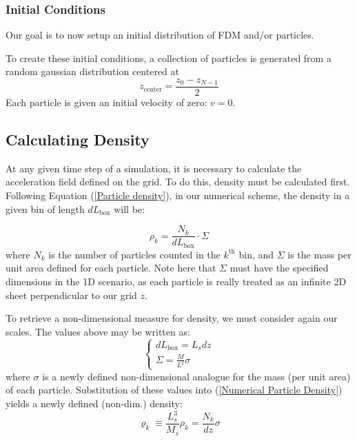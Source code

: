 \documentclass{article}
\begin{document}


\subsubsection{Initial Conditions}
Our goal is to now setup an initial distribution of FDM and/or particles.

To create these initial conditions, a collection of particles is generated from a random gaussian distribution centered at 
$$z_\text{center} = \frac{z_0 -z_{N-1}}{2} $$
Each particle is given an initial velocity of zero: $v = 0$.


\subsection{Calculating Density}
At any given time step of a simulation, it is necessary to calculate the acceleration field defined on the grid. To do this, density must be calculated first. Following Equation (\ref{Particle density}), in our numerical scheme, the density in a given bin of length $d L_\text{box}$ will be:

\begin{equation}
\rho_k = \frac{N_k}{d L_\text{box}}\cdot \Sigma
\label{Numerical Particle Density}
\end{equation}
where $N_k$ is the number of particles counted in the $k^\text{th}$ bin, and $\Sigma$ is the mass per unit area defined for each particle. Note here that $\Sigma$ must have the specified dimensions in the 1D scenario, as each particle is really treated as an infinite 2D sheet perpendicular to our grid $z$. 

To retrieve a non-dimensional measure for density, we must consider again our scales. The values above may be written as:
\begin{equation*}
    \begin{cases}
    d L_\text{box} = L_s dz \\
    \Sigma = \frac{M}{L^2} \sigma
    \end{cases}
\end{equation*}
where $\sigma$ is a newly defined non-dimensional analogue for the mass (per unit area) of each particle. Substitution of these values into (\ref{Numerical Particle Density}) yields a newly defined (non-dim.) density:
$$\varrho_k \equiv \frac{L_s^3}{M_s} \rho_k = \frac{N_k}{dz}\sigma$$
\end{document}
